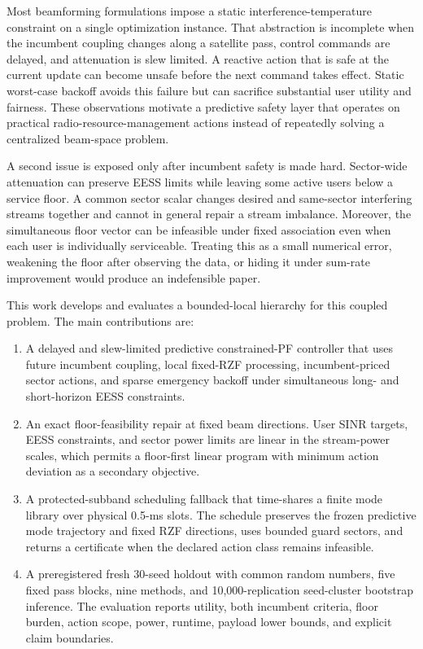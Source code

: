 \documentclass[journal]{IEEEtran}
\begin{document}
Most beamforming formulations impose a static interference-temperature constraint on a single optimization instance. That abstraction is incomplete when the incumbent coupling changes along a satellite pass, control commands are delayed, and attenuation is slew limited. A reactive action that is safe at the current update can become unsafe before the next command takes effect. Static worst-case backoff avoids this failure but can sacrifice substantial user utility and fairness. These observations motivate a predictive safety layer that operates on practical radio-resource-management actions instead of repeatedly solving a centralized beam-space problem.

A second issue is exposed only after incumbent safety is made hard. Sector-wide attenuation can preserve EESS limits while leaving some active users below a service floor. A common sector scalar changes desired and same-sector interfering streams together and cannot in general repair a stream imbalance. Moreover, the simultaneous floor vector can be infeasible under fixed association even when each user is individually serviceable. Treating this as a small numerical error, weakening the floor after observing the data, or hiding it under sum-rate improvement would produce an indefensible paper.

This work develops and evaluates a bounded-local hierarchy for this coupled problem. The main contributions are:
\begin{enumerate}
\item A delayed and slew-limited predictive constrained-PF controller that uses future incumbent coupling, local fixed-RZF processing, incumbent-priced sector actions, and sparse emergency backoff under simultaneous long- and short-horizon EESS constraints.
\item An exact floor-feasibility repair at fixed beam directions. User SINR targets, EESS constraints, and sector power limits are linear in the stream-power scales, which permits a floor-first linear program with minimum action deviation as a secondary objective.
\item A protected-subband scheduling fallback that time-shares a finite mode library over physical 0.5-ms slots. The schedule preserves the frozen predictive mode trajectory and fixed RZF directions, uses bounded guard sectors, and returns a certificate when the declared action class remains infeasible.
\item A preregistered fresh 30-seed holdout with common random numbers, five fixed pass blocks, nine methods, and 10,000-replication seed-cluster bootstrap inference. The evaluation reports utility, both incumbent criteria, floor burden, action scope, power, runtime, payload lower bounds, and explicit claim boundaries.
\end{enumerate}
\end{document}
